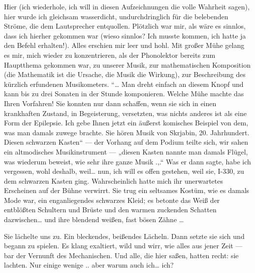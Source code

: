 Hier (ich wiederhole, ich will in diesen Aufzeichnungen die volle
Wahrheit sagen), hier wurde ich gleichsam wasserdicht,
undurchdringlich für die belebenden Ströme, die dem Lautsprecher
entquollen. Plötzlich war mir, als wäre es sinnlos, dass ich
hierher gekommen war (wieso sinnlos? Ich musste kommen, ich hatte
ja den Befehl erhalten!). Alles erschien mir leer und hohl. Mit
großer Mühe gelang es mir, mich wieder zu konzentrieren, als der
Phonolektor bereits zum Hauptthema gekommen war, zu unserer Musik,
zur mathematischen Komposition (die Mathematik ist die Ursache, die
Musik die Wirkung), zur Beschreibung des kürzlich erfundenen
Musikometers. “\ldots{} Man dreht einfach an diesem Knopf und kann bis
zu drei Sonaten in der Stunde komponieren. Welche Mühe machte das
Ihren Vorfahren! Sie konnten nur dann schaffen, wenn sie sich in
einen krankhaften Zustand, in
\glq{}Begeisterung\grq{}, versetzten, was nichts
anderes ist als eine Form der Epilepsie. Ich gebe Ihnen jetzt ein
äußerst komisches Beispiel von dem, was man damals zuwege brachte.
Sie hören Musik von Skrjabin, 20. Jahrhundert. Diesen schwarzen
Kasten“ — der Vorhang auf dem Podium teilte sich, wir sahen ein
altmodisches Musikinstrument — „diesen Kasten nannte man damals
Flügel, was wiederum beweist, wie sehr ihre ganze Musik .,.“ Was er
dann sagte, habe ich vergessen, wohl deshalb, weil\ldots{} nun, ich will
es offen gestehen, weil sie, I-330, zu dem schwarzen Kasten ging.
Wahrscheinlich hatte mich ihr unerwartetes Erscheinen auf der Bühne
verwirrt. Sie trug ein seltsames Kostüm, wie es damals Mode war,
ein enganliegendes schwarzes Kleid; es betonte das Weiß der
entblößten Schultern und Brüste und den warmen zuckenden Schatten
dazwischen\ldots{} und ihre blendend weißen, fast bösen Zähne \ldots{}

Sie lächelte uns zu. Ein bleckendes, beißendes Lächeln. Dann setzte
sie sich und begann zu spielen. Es klang exaltiert, wild und wirr,
wie alles aus jener Zeit — bar der Vernunft des Mechanischen. Und
alle, die hier saßen, hatten recht: sie lachten. Nur einige wenige
.. aber warum auch ich\ldots{} ich?

